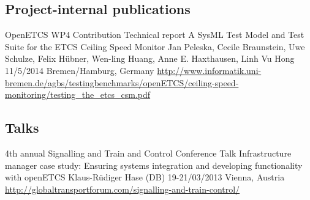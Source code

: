 
\subsection{Project-internal publications}

\begin{activity}{OpenETCS WP4 Contribution}
		{Technical report}
		{A SysML Test Model and Test Suite for the ETCS Ceiling Speed Monitor}
		{Jan Peleska, Cecile Braunstein, Uwe Schulze, Felix Hübner, Wen-ling Huang, Anne E. Haxthausen, Linh Vu Hong}
			{11/5/2014}
		{Bremen/Hamburg, Germany}
			{\url{http://www.informatik.uni-bremen.de/agbs/testingbenchmarks/openETCS/ceiling-speed-monitoring/testing_the_etcs_csm.pdf}}
	\desc{}
\end{activity}


\subsection{Talks}

\begin{activity}{4th annual Signalling and Train and Control Conference}
		{Talk}
		{Infrastructure manager case study: Ensuring systems integration and developing functionality with openETCS}
		{Klaus-R\"{u}diger Hase (DB)}
			{19-21/03/2013}
		{Vienna, Austria}
			{\url{http://globaltransportforum.com/signalling-and-train-control/}}
\end{activity}

